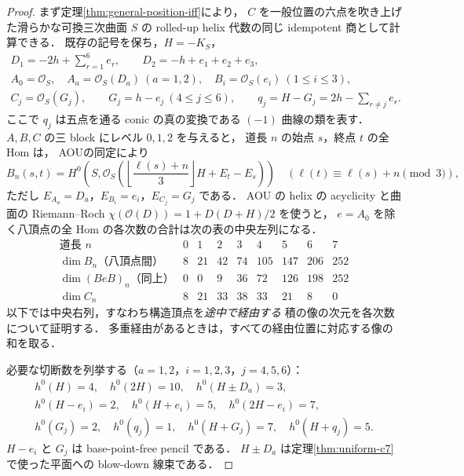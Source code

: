 \begin{proof}
まず定理\ref{thm:general-position-iff}により，
$C$ を一般位置の六点を吹き上げた滑らかな可換三次曲面 $S$ の
rolled-up helix 代数の同じ idempotent 商として計算できる．
既存の記号を保ち，$H=-K_S$，
\[
\begin{gathered}
 D_1=-2h+\sum_{r=1}^6e_r,\qquad D_2=-h+e_1+e_2+e_3,\\
 A_0=\mathcal O_S,\quad A_a=\mathcal O_S(D_a)\ (a=1,2),\quad
 B_i=\mathcal O_S(e_i)\ (1\le i\le3),\\
 C_j=\mathcal O_S(G_j),\qquad G_j=h-e_j\ (4\le j\le6),\qquad
 q_j=H-G_j=2h-\sum_{r\ne j}e_r.
\end{gathered}
\]
ここで $q_j$ は五点を通る conic の真の変換である $(-1)$ 曲線の類を表す．
$A,B,C$ の三 block にレベル $0,1,2$ を与えると，
道長 $n$ の始点 $s$，終点 $t$ の全 Hom は，
AOU\cite[(4.1), (4.9)]{AOU}の同定により
\begin{equation}\label{eq:hilbert-block}
 B_n(s,t)=H^0\!\left(S,\mathcal O_S\left(
 \left\lfloor\frac{\ell(s)+n}{3}\right\rfloor H+E_t-E_s\right)\right)
 \quad(\ell(t)\equiv\ell(s)+n\pmod3),
\end{equation}
ただし $E_{A_a}=D_a$，$E_{B_i}=e_i$，$E_{C_j}=G_j$ である．
AOU の helix の acyclicity と曲面の Riemann--Roch
$\chi(\mathcal O(D))=1+D(D+H)/2$ を使うと，
$e=A_0$ を除く八頂点の全 Hom の各次数の合計は次の表の中央左列になる．
\[
\begin{array}{c|rrrrrrrr}
\text{道長 }n&0&1&2&3&4&5&6&7\\\hline
\dim B_n\text{（八頂点間）}&8&21&42&74&105&147&206&252\\
\dim (BeB)_n\text{（同上）}&0&0&9&36&72&126&198&252\\
\dim C_n&8&21&33&38&33&21&8&0
\end{array}
\]
以下では中央右列，すなわち構造頂点を\emph{途中で経由する}
積の像の次元を各次数について証明する．
多重経由があるときは，すべての経由位置に対応する像の和を取る．

必要な切断数を列挙する（$a=1,2$，$i=1,2,3$，$j=4,5,6$）：
\begin{equation}\label{eq:hilbert-basic-h0}
\begin{gathered}
 h^0(H)=4,\quad h^0(2H)=10,\quad h^0(H\pm D_a)=3,\\
 h^0(H-e_i)=2,\quad h^0(H+e_i)=5,\quad h^0(2H-e_i)=7,\\
 h^0(G_j)=2,\quad h^0(q_j)=1,\quad
 h^0(H+G_j)=7,\quad h^0(H+q_j)=5.
\end{gathered}
\end{equation}
$H-e_i$ と $G_j$ は base-point-free pencil である．
$H\pm D_a$ は定理\ref{thm:uniform-c7}で使った平面への blow-down 線束である．


\end{proof}
